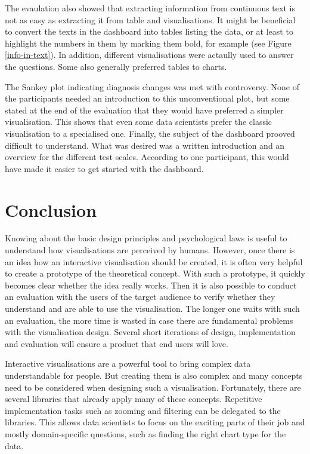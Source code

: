 \documentclass[11pt]{article}
\begin{document}
The evaulation also showed that extracting information from continuous text is not as easy as extracting it from table and visualisations. It might be beneficial to convert the texts in the dashboard into tables listing the data, or at least to highlight the numbers in them by marking them bold, for example (see Figure \ref{info-in-text}). In addition, different visualisations were actaully used to answer the questions. Some also generally preferred tables to charts.

The Sankey plot indicating diagnosis changes was met with controversy. None of the participants needed an introduction to this unconventional plot, but some stated at the end of the evaluation that they would have preferred a simpler visualisation. This shows that even some data scientists prefer the classic visualisation to a specialised one. Finally, the subject of the dashboard prooved difficult to understand. What was desired was a written introduction and an overview for the different test scales. According to one participant, this would have made it easier to get started with the dashboard.

\section{Conclusion}

Knowing about the basic design principles and psychological laws is useful to understand how visualisations are perceived by humans. However, once there is an idea how an interactive visualisation should be created, it is often very helpful to create a prototype of the theoretical concept. With such a prototype, it quickly becomes clear whether the idea really works. Then it is also possible to conduct an evaluation with the users of the target audience to verify whether they understand and are able to use the visualisation. The longer one waits with such an evaluation, the more time is wasted in case there are fundamental problems with the visualisation design. Several short iterations of design, implementation and evaluation will ensure a product that end users will love.

Interactive visualisations are a powerful tool to bring complex data understandable for people. But creating them is also complex and many concepts need to be considered when designing such a visualisation. Fortunately, there are several libraries that already apply many of these concepts. Repetitive implementation tasks such as zooming and filtering can be delegated to the libraries. This allows data scientists to focus on the exciting parts of their job and mostly domain-specific questions, such as finding the right chart type for the data.
\end{document}
